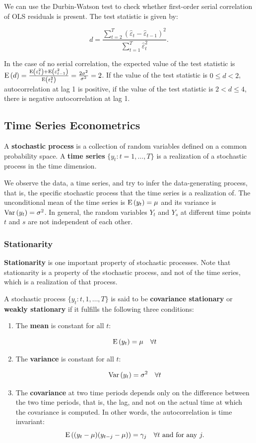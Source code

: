 We can use the Durbin-Watson test to check whether first-order serial correlation of OLS residuals is present. The test statistic is given by:

\begin{equation}
  d = \frac{\sum^T_{t=2}(\hat{\varepsilon}_t-\hat{\varepsilon}_{t-1})^2}{\sum^T_{t=1}\hat{\varepsilon}^2_t}.
\end{equation}

In the case of no serial correlation, the expected value of the test statistic is $\mathrm{E}\left({d}\right) = \frac{\mathrm{E}\left({\varepsilon_t^2}\right)+\mathrm{E}\left({\varepsilon_{t-1}^2}\right)}{\mathrm{E}\left({\varepsilon_t^2}\right)} = \frac{2\sigma^2}{\sigma^2} = 2$. If the value of the test statistic is $0 \leq d < 2$, autocorrelation at lag 1 is positive, if the value of the test statistic is $2 < d \leq 4$, there is negative autocorrelation at lag 1. 

\subsection{Time Series Econometrics}

A \textbf{stochastic process} is a collection of random variables defined on a common probability space. A \textbf{time series} $\{y_t:t=1,\dots,T\}$ is a realization of a stochastic process in the time dimension. 

We observe the data, a time series, and try to infer the data-generating process, that is, the specific stochastic process that the time series is a realization of. The unconditional mean of the time series is $\mathrm{E}\left({y_t}\right) = \mu$ and its variance is $\mathrm{Var}\left({y_t}\right) = \sigma^2$. In general, the random variables $Y_t$ and $Y_s$ at different time points $t$ and $s$ are not independent of each other.

\subsubsection{Stationarity}

\textbf{Stationarity} is one important property of stochastic processes. Note that stationarity is a property of the stochastic process, and not of the time series, which is a realization of that process.

A stochastic process $\{y_t:t,1,\dots,T\}$ is said to be \textbf{covariance stationary} or \textbf{weakly stationary} if it fulfills the following three conditions:

\begin{enumerate}
	\item The \textbf{mean} is constant for all $t$:
	
	\[
		\mathrm{E}\left({y_t}\right) = \mu \quad \forall t
	\]
	\item The \textbf{variance} is constant for all $t$:
	
	\[
		\mathrm{Var}\left({y_t}\right) = \sigma^2 \quad \forall t
	\]
	\item The \textbf{covariance } at two time periods depends only on the difference between the two time periods, that is, the lag, and not on the actual time at which the covariance is computed. In other words, the autocorrelation is time invariant:
	\[
		\mathrm{E}\left({(y_t - \mu)(y_{t-j} - \mu)}\right) = \gamma_j \quad \forall t \text{ and for any } j.
	\]
\end{enumerate}


